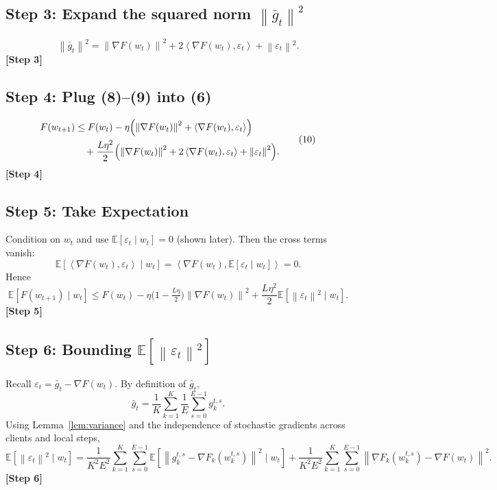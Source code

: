 \documentclass{article}
\newcommand{\EE}{\mathbb{E}}
\newcommand{\norm}[1]{\left\|#1\right\|}
\newcommand{\inner}[2]{\left\langle #1,#2\right\rangle}
\newcommand{\grad}{\nabla}
\begin{document}
\subsection*{Step 3: Expand the squared norm $\norm{\bar g_t}^{2}$}
\[
\norm{\bar g_t}^{2}
= \norm{\grad F(w_t)}^{2}
+ 2\inner{\grad F(w_t)}{\varepsilon_t}
+ \norm{\varepsilon_t}^{2}.
\tag{9}
\]
\textbf{[Step 3]}

\subsection*{Step 4: Plug (8)–(9) into (6)}
\[
\begin{aligned}
F(w_{t+1})
&\le F(w_t)-\eta\Bigl(\norm{\grad F(w_t)}^{2}
+ \inner{\grad F(w_t)}{\varepsilon_t}\Bigr)\\
&\quad +\frac{L\eta^{2}}{2}\Bigl(\norm{\grad F(w_t)}^{2}
+2\inner{\grad F(w_t)}{\varepsilon_t}
+\norm{\varepsilon_t}^{2}\Bigr).
\end{aligned}
\tag{10}
\]
\textbf{[Step 4]}

\subsection*{Step 5: Take Expectation}
Condition on $w_t$ and use $\EE[\varepsilon_t\mid w_t]=0$ (shown later). Then the cross terms vanish:
\[
\EE\!\left[\inner{\grad F(w_t)}{\varepsilon_t}\mid w_t\right]=
\inner{\grad F(w_t)}{\EE[\varepsilon_t\mid w_t]} =0 .
\tag{11}
\]
Hence
\[
\EE\!\left[F(w_{t+1})\mid w_t\right]
\le F(w_t)-\eta\bigl(1-\tfrac{L\eta}{2}\bigr)\norm{\grad F(w_t)}^{2}
+\frac{L\eta^{2}}{2}\EE\!\left[\norm{\varepsilon_t}^{2}\mid w_t\right].
\tag{12}
\]
\textbf{[Step 5]}

\subsection*{Step 6: Bounding $\EE[\norm{\varepsilon_t}^{2}]$}
Recall $\varepsilon_t = \bar g_t-\grad F(w_t)$. By definition of $\bar g_t$,
\[
\bar g_t = \frac{1}{K}\sum_{k=1}^{K}\frac{1}{E}\sum_{s=0}^{E-1} g_{k}^{t,s}.
\]
Using Lemma~\ref{lem:variance} and the independence of stochastic gradients across
clients and local steps,
\[
\EE\!\left[\norm{\varepsilon_t}^{2}\mid w_t\right]
= \frac{1}{K^{2}E^{2}}\sum_{k=1}^{K}\sum_{s=0}^{E-1}
\EE\!\left[\norm{g_{k}^{t,s}-\grad F_k(w_{k}^{t,s})}^{2}\mid w_t\right]
+ \frac{1}{K^{2}E^{2}}\sum_{k=1}^{K}\sum_{s=0}^{E-1}
\norm{\grad F_k(w_{k}^{t,s})-\grad F(w_t)}^{2}.
\tag{13}
\]
\textbf{[Step 6]}
\end{document}
